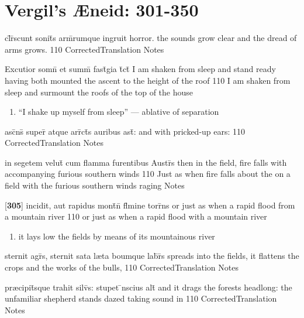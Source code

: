 \section{Vergil's {\AE}neid: 301-350} %

\latline
  {cl\={}r\={}scunt sonit\={}s arm\={}rumque ingruit horror.}
  { the sounds grow clear and the dread of arms grows. }
  {110}
  { CorrectedTranslation }
  { Notes }


\latline
  {Excutior somn\={} et summ\={\macron {\i}} fast\={\macron {\i}}gia t\={}ct\={\macron {\i}}}
  { I am shaken from sleep and stand ready having both mounted the ascent to the height of the roof  }
  {110}
  { I am shaken from sleep and surmount the roofs of the top of the house }
  { \begin{enumerate}
  	\item ``I shake up myself from sleep'' --- ablative of separation
  \end{enumerate} }


\latline
  {asc\={}ns\={} super\={} atque arr\={}ct\={\macron {\i}}s auribus ast\={}:}
  { and with pricked-up ears: }
  {110}
  { CorrectedTranslation }
  { Notes }


\latline
  {in segetem velut\={\macron {\i}} cum flamma furentibus Austr\={\macron {\i}}s}
  { then in the field, fire falls with accompanying furious southern winds }
  {110}
  { Just as when fire falls about the on a field with the furious southern winds raging }
  { Notes }


\latline
  {[\textbf{305}] incidit, aut rapidus mont\={}n\={} fl\={}mine torr\={}ns}
  { or just as when a rapid flood from a mountain river }
  {110}
  { or just as when a rapid flood with a mountain river }
  { \begin{enumerate}
  	\item it lays low the fields by means of its mountainous river
  \end{enumerate} }


\latline
  {sternit agr\={}s, sternit sata l{\ae}ta boumque lab\={}r\={}s}
  { spreads into the fields, it flattens the crops and the works of the bulls,  }
  {110}
  { CorrectedTranslation }
  { Notes }


\latline
  {pr{\ae}cipit\={\macron {\i}}sque trahit silv\={}s: stupet \={\macron {\i}}nscius alt\={}}
  { and it drags the forests headlong: the unfamiliar shepherd stands dazed taking sound in   }
  {110}
  { CorrectedTranslation }
  { Notes }


